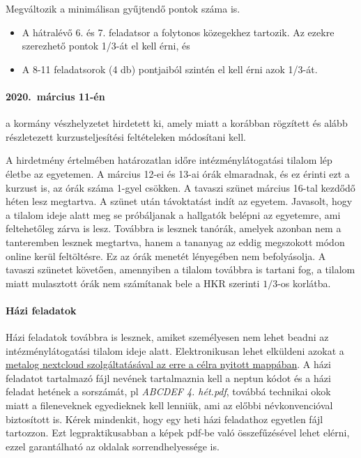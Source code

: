 \documentclass[12pt,a4paper]{scrartcl}
\begin{document}
Megváltozik a minimálisan gyűjtendő pontok száma is.
\begin{itemize}
\item A hátralévő 6. és 7. feladatsor a folytonos közegekhez tartozik. Az ezekre szerezhető pontok 1/3-át el kell érni, és
\item A 8-11 feladatsorok (4 db) pontjaiból szintén el kell érni azok 1/3-át.
\end{itemize}
    
\paragraph{2020.\ március 11-én} a kormány vészhelyzetet hirdetett ki, amely miatt a korábban rögzített és alább részletezett kurzusteljesítési feltételeken módosítani kell.

A hirdetmény értelmében határozatlan időre intézménylátogatási tilalom lép életbe az egyetemen. A március 12-ei és 13-ai órák elmaradnak, és ez érinti ezt a kurzust is, az órák száma 1-gyel csökken. A tavaszi szünet március 16-tal kezdődő héten lesz megtartva. A szünet után távoktatást indít az egyetem. Javasolt, hogy a tilalom ideje alatt meg se próbáljanak a hallgatók belépni az egyetemre, ami feltehetőleg zárva is lesz. Továbbra is lesznek tanórák, amelyek azonban nem a tanteremben lesznek megtartva, hanem a tananyag az eddig megszokott módon online kerül feltöltésre. Ez az órák menetét lényegében nem befolyásolja. A tavaszi szünetet követően, amennyiben a tilalom továbbra is tartani fog, a tilalom miatt mulasztott órák nem számítanak bele a HKR szerinti $1/3$-os korlátba.

\paragraph{Házi feladatok} Házi feladatok továbbra is lesznek, amiket személyesen nem lehet beadni az intézménylátogatási tilalom ideje alatt. Elektronikusan lehet elküldeni azokat a \href{https://metalog.elte.hu/nextcloud/index.php/s/kBrEWKzdcGWSmsY}{metalog nextcloud szolgáltatásával az erre a célra nyitott mappában}. A házi feladatot tartalmazó fájl nevének tartalmaznia kell a neptun kódot és a házi feladat hetének a sorszámát, pl \textit{ABCDEF 4. hét.pdf}, továbbá technikai okok miatt a fileneveknek egyedieknek kell lenniük, ami az előbbi névkonvencióval biztosított is. Kérek mindenkit, hogy egy heti házi feladathoz egyetlen fájl tartozzon. Ezt legpraktikusabban a képek pdf-be való összefűzésével lehet elérni, ezzel garantálható az oldalak sorrendhelyessége is.
\end{document}
